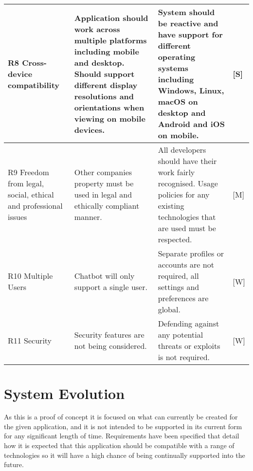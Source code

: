 \documentclass[9pt]{article} %
\begin{document}
\begin{center}
\begin{longtable}{ | m{3cm} | m{7cm} | m{7cm} | m{0.5cm} | }
		R8 Cross-device compatibility & 
		Application should work across multiple platforms including mobile and desktop. Should support different display resolutions and orientations when viewing on mobile devices. & 
		System should be reactive and have support for different operating systems including Windows, Linux, macOS on desktop and Android and iOS on mobile. & 
		[S] \\
		
		\hline
		
		R9 Freedom from legal, social, ethical and professional issues & 
		Other companies property must be used in legal and ethically compliant manner. & 
		All developers should have their work fairly recognised. Usage policies for any existing technologies that are used must be respected. &
		[M] \\
		
		\hline
		
		R10 Multiple Users & 
		Chatbot will only support a single user. & 
		Separate profiles or accounts are not required, all settings and preferences are global. & 
		[W] \\
		
		\hline
		
		R11 Security & 
		Security features are not being considered. & 
		Defending against any potential threats or exploits is not required. & 
		[W] \\
		
		\hline
		
	\end{longtable}
	\end{center}
	
	\section{System Evolution}
	As this is a proof of concept it is focused on what can currently be created for the given application, and it is not intended to be supported in its current form for any significant length of time. Requirements have been specified that detail how it is expected that this application should be compatible with a range of technologies so it will have a high chance of being continually supported into the future. 



\end{document}
